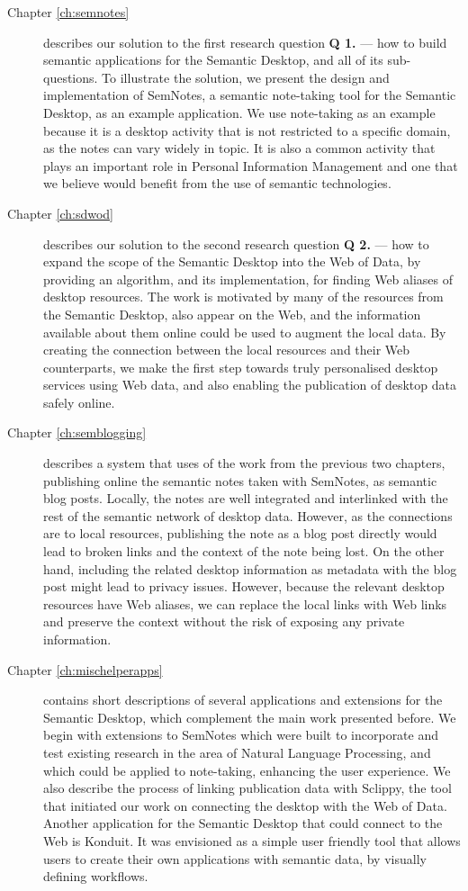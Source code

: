 \begin{description}
\item[Chapter \ref{ch:semnotes}] describes our solution to the first research question \textbf{Q 1.} --- how to build semantic applications for the Semantic Desktop, and all of its sub-questions. To illustrate the solution, we present the design and implementation of SemNotes, a semantic note-taking tool for the Semantic Desktop, as an example application. We use note-taking as an example because it is a desktop activity that is not restricted to a specific domain, as the notes can vary widely in topic. It is also a common activity that plays an important role in Personal Information Management and one that we believe would benefit from the use of semantic technologies.
\item[Chapter \ref{ch:sdwod}] describes our solution to the second research question \textbf{Q 2.} ---  how to expand the scope of the Semantic Desktop into the Web of Data, by providing an algorithm, and its implementation, for finding Web aliases of desktop resources. The work is motivated by many of the resources from the Semantic Desktop, also appear on the Web, and the information available about them online could be used to augment the local data. By creating the connection between the local resources and their Web counterparts, we make the first step towards truly personalised desktop services using Web data, and also enabling the publication of desktop data safely online.
\item[Chapter \ref{ch:semblogging}] describes a system that uses of the work from the previous two chapters, publishing online the semantic notes taken with SemNotes, as semantic blog posts. Locally, the notes are well integrated and interlinked with the rest of the semantic network of desktop data. However, as the connections are to local resources,  publishing the note as a blog post directly would lead to broken links and the context of the note being lost. On the other hand, including the related desktop information as metadata with the blog post might lead to privacy issues. However, because the relevant desktop resources have Web aliases, we can replace the local links with Web links and preserve the context without the risk of exposing any private information.
\item[Chapter \ref{ch:mischelperapps}] contains short descriptions of several applications and extensions for the Semantic Desktop, which complement the main work presented before. We begin with extensions to SemNotes which were built to incorporate and test existing research in the area of Natural Language Processing, and which could be applied to note-taking, enhancing the user experience. We also describe the process of linking publication data with Sclippy, the tool that initiated our work on connecting the desktop with the Web of Data. Another application for the Semantic Desktop that could connect to the Web is Konduit. It was envisioned as a simple user friendly tool that allows users to create their own applications with semantic data, by visually defining workflows.
\end{description}

